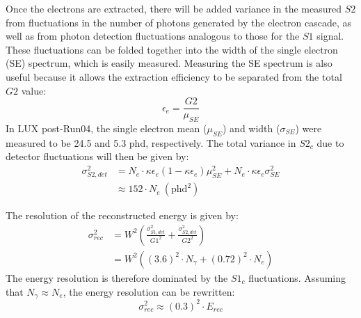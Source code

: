 Once the electrons are extracted, there will be added variance in the measured $S2$ from fluctuations in the number of photons generated by the electron cascade, as well as from photon detection fluctuations analogous to those for the $S1$ signal. These fluctuations can be folded together into the width of the single electron (SE) spectrum, which is easily measured. Measuring the SE spectrum is also useful because it allows the extraction efficiency to be separated from the total $G2$ value:
\begin{equation}
\epsilon_e=\frac{G2}{\mu_{SE}}
\end{equation}
In LUX post-Run04, the single electron mean ($\mu_{SE}$) and width ($\sigma_{SE}$) were measured to be 24.5 and 5.3 phd, respectively. The total variance in $S2_c$ due to detector fluctuations will then be given by:
\begin{equation} 
\begin{split}
\sigma_{S2,det}^2&=N_e\cdot \kappa\epsilon_e(1-\kappa\epsilon_e)\mu_{SE}^2+N_e\cdot\kappa\epsilon_e\sigma_{SE}^2\\
&\approx 152 \cdot N_e \ (\text{phd}^2)
\end{split}
\end{equation}
 
The resolution of the reconstructed energy is given by:
\begin{equation}
\begin{split}
\sigma_{rec}^2&=W^2\left(\frac{\sigma_{S1,det}^2}{G1^2}+\frac{\sigma_{S2,det}^2}{G2^2}\right)\\[1em]
&=W^2\left((3.6)^2\cdot N_{\gamma}+(0.72)^2\cdot N_e \right)
\end{split}
\end{equation}
The energy resolution is therefore dominated by the $S1_c$ fluctuations. Assuming that $N_{\gamma}\approx N_e$, the energy resolution can be rewritten:
\begin{equation}
\sigma_{rec}^2\approx (0.3)^2\cdot E_{rec}
\end{equation}


